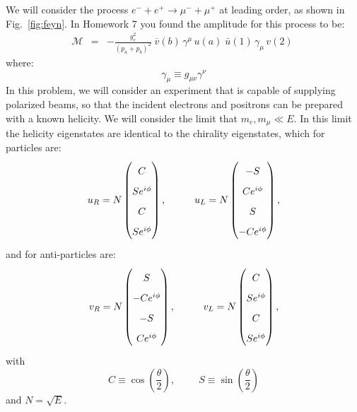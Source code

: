 \documentclass[12pt]{article}
\begin{document}
We will consider the process $e^- + e^+ \to \mu^- + \mu^+$ at leading
order, as shown in Fig.~\ref{fig:feyn}.  In Homework 7 you found the
amplitude for this process to be:
\begin{eqnarray*}
\mathcal{M}  &=&  -\frac{g_e^2}{(p_a+p_b)^2} \; \overline{v}(b) \, \gamma^\mu
  \, u(a)  \; \bar{u}(1) \, \gamma_\mu \, v(2) \; 
\end{eqnarray*}
where:
$$\gamma_\mu \equiv g_{\mu\nu} \gamma^\nu$$
In this problem, we will consider an experiment that is capable of
supplying polarized beams, so that the incident electrons and positrons
can be prepared with a known helicity.  We will consider the limit
that $m_e,m_\mu \ll E$.  In this limit the helicity eigenstates are
identical to the chirality eigenstates, which for particles are:
$$\def\arraystretch{1.7}
u_R = N \begin{pmatrix} C  \\ S e^{i\phi} \\ C \\ S e^{i\phi} \end{pmatrix}, \hspace{1cm}
u_L = N \begin{pmatrix} -S \\ C e^{i\phi} \\ S \\ -C e^{i\phi} \end{pmatrix},
$$
and for anti-particles are:
$$\def\arraystretch{1.7}
v_R = N \begin{pmatrix} S \\ -C e^{i\phi} \\ -S \\ C e^{i\phi} \end{pmatrix}, \hspace{1cm}
v_L = N \begin{pmatrix} C \\  S e^{i\phi} \\  C \\ S e^{i\phi} \end{pmatrix},
$$
with
$$C \equiv \cos \left( \frac{\theta}{2} \right), \hspace{1cm } S \equiv \sin \left( \frac{\theta}{2} \right)$$
and $N = \sqrt{E}$.\\[5pt]
\end{document}
